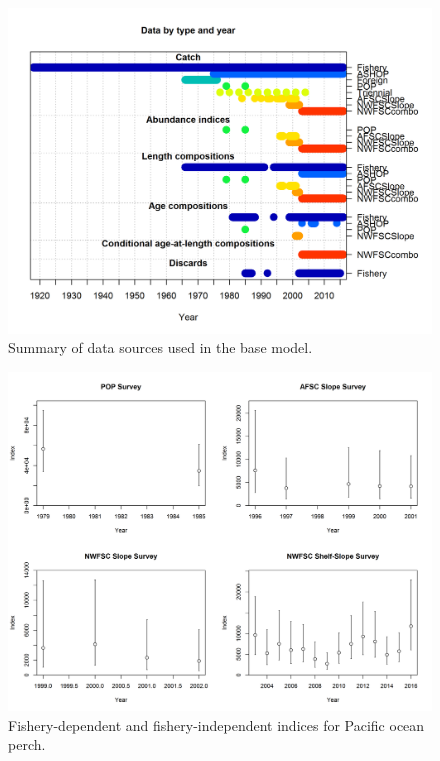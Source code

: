 \documentclass[12pt,]{article}
\begin{document}
\FloatBarrier

\begin{figure}
\centering
\includegraphics{Figures/data_plot_wo_tri.png}
\caption{Summary of data sources used in the base model.
\label{fig:data_plot}}
\end{figure}

\FloatBarrier

\begin{figure}
\centering
\includegraphics{Figures/Index_Data_4.png}
\caption{Fishery-dependent and fishery-independent indices for Pacific
ocean perch. \label{fig:indices}}
\end{figure}
\end{document}
